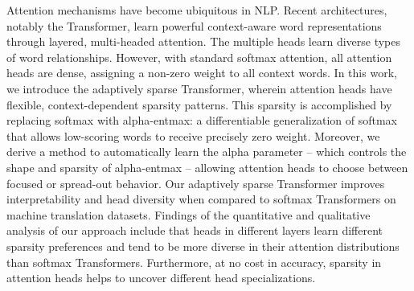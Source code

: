 Attention mechanisms have become ubiquitous in NLP. Recent architectures, notably the Transformer, learn powerful context-aware word representations through layered, multi-headed attention. The multiple heads learn diverse types of word relationships. However, with standard softmax attention, all attention heads are dense, assigning a non-zero weight to all context words.
In this work, we introduce the adaptively sparse Transformer, wherein attention heads have flexible, context-dependent sparsity patterns. This sparsity is accomplished by replacing softmax with alpha-entmax: a differentiable generalization of softmax that allows low-scoring words to receive precisely zero weight. Moreover, we derive a method to automatically learn the alpha parameter -- which controls the shape and sparsity of alpha-entmax -- allowing attention heads to choose between focused or spread-out behavior.
Our adaptively sparse Transformer improves interpretability and head diversity when compared to softmax Transformers on machine translation datasets. Findings of the quantitative and qualitative analysis of our approach include that heads in different layers learn different sparsity preferences and tend to be more diverse in their attention distributions than softmax Transformers. Furthermore, at no cost in accuracy, sparsity in attention heads helps to uncover different head specializations.